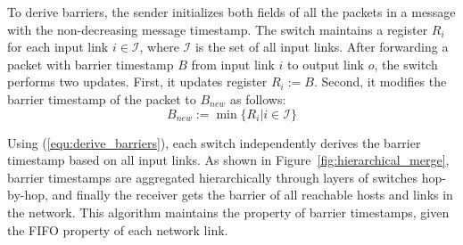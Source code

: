 To derive barriers, the sender initializes both fields of all the packets in a message with the non-decreasing message timestamp. The switch maintains a register $R_i$ for each input link $i \in \mathcal{I}$, where $\mathcal{I}$ is the set of all input links. After forwarding a packet with barrier timestamp $B$ from input link $i$ to output link $o$, the switch performs two updates. First, it updates register $R_i := B$. Second, it modifies the barrier timestamp of the packet to $B_{new}$ as follows:
\begin{equation}\label{equ:derive_barriers}
B_{new}:=\min\{R_i| i\in \mathcal{I}\}
\end{equation}



Using (\ref{equ:derive_barriers}), each switch independently derives the barrier timestamp based on all input links.
As shown in Figure~\ref{fig:hierarchical_merge}, barrier timestamps are aggregated hierarchically through layers of switches hop-by-hop, and finally the receiver gets the barrier of all reachable hosts and links in the network.
This algorithm maintains the property of barrier timestamps, given the FIFO property of each network link.



